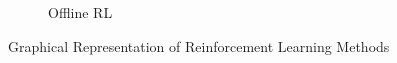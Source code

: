 \begin{figure}[htbp]
\begin{subfigure}[b]{0.35\textwidth}
         \caption{Offline RL}
         \label{fig:offline}
     \end{subfigure}
    \hfill
    \caption{Graphical Representation of Reinforcement Learning Methods \cite{levine202rl_tutorial}}
    \label{fig:rl_methods}
\end{figure}

